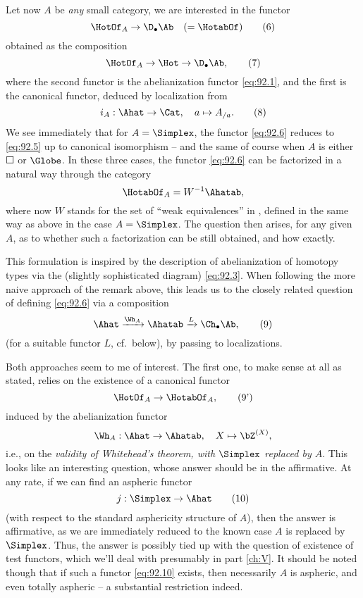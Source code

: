 Let now $A$ be \emph{any} small category, we are interested in the
functor
\begin{equation}
  \label{eq:92.6}
  \HotOf_A \to \D_\bullet\Ab\quad (=\HotabOf)\tag{6}
\end{equation}
obtained as the composition
\begin{equation}
  \label{eq:92.7}
  \HotOf_A\to\Hot \to\D_\bullet\Ab,\tag{7}
\end{equation}
where the second functor is the abelianization functor
\eqref{eq:92.1}, and the first is the canonical functor, deduced by
localization from
\begin{equation}
  \label{eq:92.8}
  i_A:\Ahat\to\Cat,\quad a\mapsto A_{/a}.\tag{8}
\end{equation}
We see immediately that for $A=\Simplex$, the functor \eqref{eq:92.6}
reduces to \eqref{eq:92.5} up to canonical isomorphism -- and the same
of course when $A$ is either $\Square$ or $\Globe$. In
these three cases, the functor \eqref{eq:92.6} can be factorized in a
natural way through the category
\[\HotabOf_A = W^{-1}\Ahatab,\]
where now $W$ stands for the set of ``weak equivalences'' in \Ahatab,
defined in the same way as above in the case $A=\Simplex$. The
question then arises, for any given $A$, as to whether such a
factorization can be still obtained, and how exactly.

This formulation is inspired by the description of abelianization of
homotopy types via the (slightly sophisticated diagram)
\eqref{eq:92.3}. When following the more naive approach of the remark
above, this leads us to the closely related question of defining
\eqref{eq:92.6} via a composition
\begin{equation}
  \label{eq:92.9}
  \Ahat\xrightarrow{\Wh_A} \Ahatab \xrightarrow L \Ch_\bullet\Ab,\tag{9}
\end{equation}
(for a suitable functor $L$, cf.\ below), by passing to localizations.

Both approaches seem to me of interest. The first one, to make sense
at all as stated, relies on the existence of a canonical functor
\begin{equation}
  \label{eq:92.9prime}
  \HotOf_A\to\HotabOf_A,\tag{9'}
\end{equation}
induced by the abelianization functor
\[\Wh_A:\Ahat\to\Ahatab,\quad X\mapsto\bZ^{(X)},\]
i.e., on the \emph{validity of Whitehead's theorem, with $\Simplex$
  replaced by $A$}. This looks like an interesting question, whose
answer should be in the affirmative. At any rate, if we can find an
aspheric functor
\begin{equation}
  \label{eq:92.10}
  j:\Simplex\to\Ahat\tag{10}
\end{equation}
(with respect to the standard asphericity structure of $A$), then the
answer is affirmative, as we are immediately reduced to the known case
$A$ is replaced by $\Simplex$. Thus, the answer is possibly tied up
with the question of existence of test functors, which we'll deal with
presumably in part \ref{ch:V}. It should be noted though that if such
a functor \eqref{eq:92.10} exists, then necessarily $A$ is aspheric,
and even totally aspheric -- a substantial restriction indeed.


